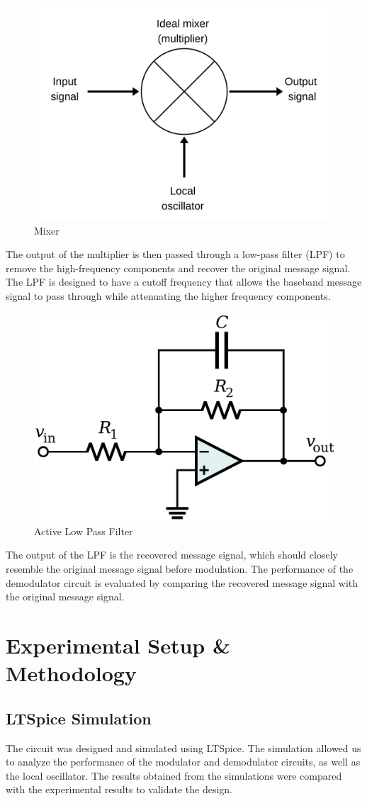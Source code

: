 \documentclass[conference]{IEEEtran}
\begin{document}
\begin{figure}
    \centering
    \includegraphics[width=0.5\linewidth]{mixer.png}
    \caption{Mixer}
\end{figure}

The output of the multiplier is then passed through a low-pass filter (LPF) to remove the high-frequency components and recover the original message signal. The LPF is designed to have a cutoff frequency that allows the baseband message signal to pass through while attenuating the higher frequency components.

\begin{figure}
    \centering
    \includegraphics[width=0.75\linewidth]{Images/Active_LPF.png}
    \caption{Active Low Pass Filter}
\end{figure}

The output of the LPF is the recovered message signal, which should closely resemble the original message signal before modulation. The performance of the demodulator circuit is evaluated by comparing the recovered message signal with the original message signal.

\section{Experimental Setup \& Methodology}
\subsection{LTSpice Simulation}
The circuit was designed and simulated using LTSpice. The simulation allowed us to analyze the performance of the modulator and demodulator circuits, as well as the local oscillator. The results obtained from the simulations were compared with the experimental results to validate the design.
\end{document}
